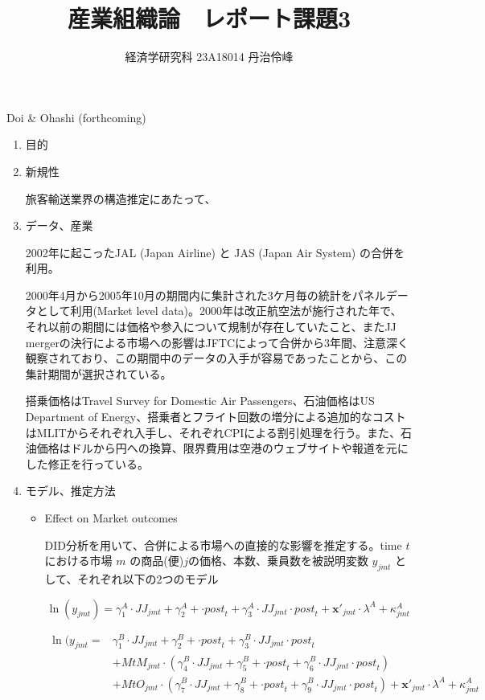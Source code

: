 \documentclass{jsarticle}
\begin{document}
\title{産業組織論　レポート課題3}
\author{経済学研究科 23A18014 丹治伶峰}
\date{}
\maketitle

Doi \& Ohashi (forthcoming)

\begin{enumerate}

\item 目的

\item 新規性

旅客輸送業界の構造推定にあたって、

\item データ、産業

2002年に起こったJAL (Japan Airline) と JAS (Japan Air System) の合併を利用。

2000年4月から2005年10月の期間内に集計された3ケ月毎の統計をパネルデータとして利用(Market level data)。2000年は改正航空法が施行された年で、それ以前の期間には価格や参入について規制が存在していたこと、またJJ mergerの決行による市場への影響はJFTCによって合併から3年間、注意深く観察されており、この期間中のデータの入手が容易であったことから、この集計期間が選択されている。

搭乗価格はTravel Survey for Domestic Air Passengers、石油価格はUS Department of Energy、搭乗者とフライト回数の増分による追加的なコストはMLITからそれぞれ入手し、それぞれCPIによる割引処理を行う。また、石油価格はドルから円への換算、限界費用は空港のウェブサイトや報道を元にした修正を行っている。

\item モデル、推定方法

\begin{itemize}

\item Effect on Market outcomes

DID分析を用いて、合併による市場への直接的な影響を推定する。time $t$における市場 $m$ の商品(便)$j$の価格、本数、乗員数を被説明変数 $y_{jmt}$ として、それぞれ以下の2つのモデル

\[\ln(y_{jmt})=\gamma^A_1 \cdot \textit{JJ}_{jmt} + \gamma^A_2 + \cdot \textit{post}_t +\gamma_3^A \cdot \textit{JJ}_{jmt} \cdot \textit{post}_t + \mathbf{x}'_{jmt} \cdot \lambda^A +\kappa_{jmt}^A \]

\begin{align*}
\ln(y_{jmt}= &\gamma^B_1 \cdot \textit{JJ}_{jmt} + \gamma^B_2 + \cdot \textit{post}_t +\gamma_3^B \cdot \textit{JJ}_{jmt} \cdot \textit{post}_t \\
 & + \textit{MtM}_{jmt} \cdot (\gamma^B_4 \cdot \textit{JJ}_{jmt} + \gamma^B_5 + \cdot \textit{post}_t +\gamma_6^B \cdot \textit{JJ}_{jmt} \cdot \textit{post}_t ) \\
 & +\textit{MtO}_{jmt} \cdot (\gamma^B_7 \cdot \textit{JJ}_{jmt} + \gamma^B_8 + \cdot \textit{post}_t +\gamma_9^B \cdot \textit{JJ}_{jmt} \cdot \textit{post}_t) + \mathbf{x}'_{jmt} \cdot \lambda^A +\kappa_{jmt}^A 
 \end{align*}


\end{itemize}
\end{enumerate}
\end{document}
